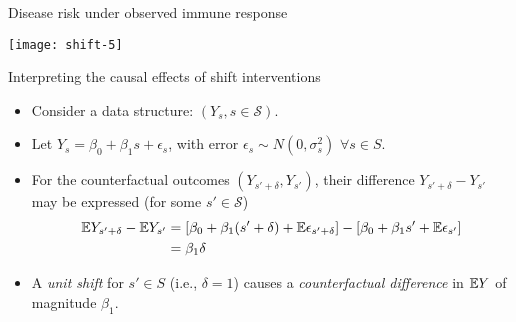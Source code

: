 \documentclass{beamer}
\begin{document}

\begin{frame}[c]{Disease risk under observed immune response}

\hspace*{-1cm}\texttt{[image: shift-5]}

\note{
}

\end{frame}


\begin{frame}[c]{Interpreting the causal effects of shift interventions}

\begin{center}
\begin{itemize}
  \itemsep6pt
  \item Consider a data structure: $(Y_s, s \in \mathcal{S})$.
  \item Let $Y_s = \beta_0 + \beta_1 s + \epsilon_s$, with error $\epsilon_s
    \sim N(0, \sigma^2_s)$ $\forall s \in S$.
  \item For the counterfactual outcomes $(Y_{s' + \delta}, Y_{s'})$, their
    difference $Y_{s' + \delta} - Y_{s'}$ may be expressed (for some
    $s' \in \mathcal{S}$)
    \begin{align*}
      \mathbb{E} Y_{s' + \delta} - \mathbb{E} Y_{s'} &= [\beta_0 + \beta_1 (s' + \delta) +
          \mathbb{E} \epsilon_{s' + \delta}] - [\beta_0 + \beta_1 s' +
          \mathbb{E} \epsilon_{s'}] \\
        &= \beta_1 \delta
    \end{align*}
  \item A \textit{unit shift} for $s' \in S$ (i.e., $\delta = 1$) causes a
    \textit{counterfactual difference} in $\mathbb{E} Y$ of magnitude $\beta_1$.
\end{itemize}
\end{center}


\end{frame}
\end{document}
